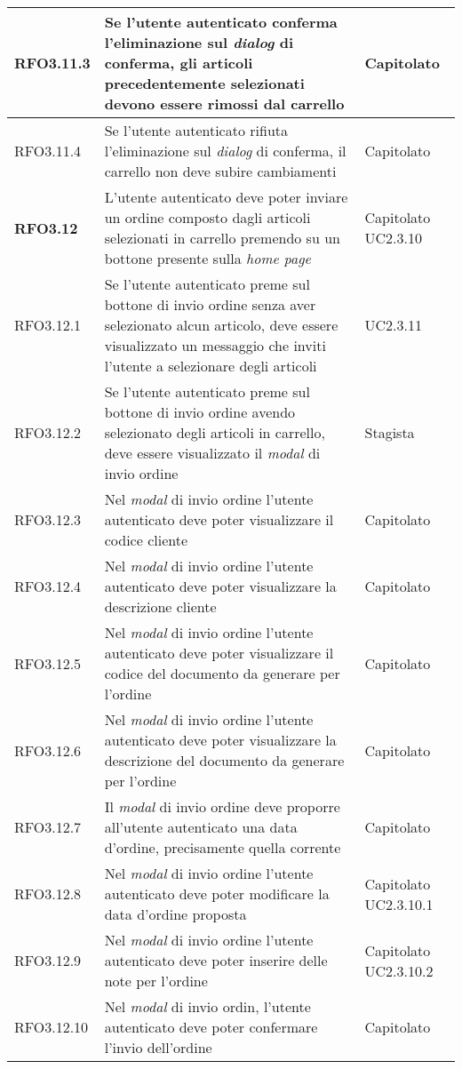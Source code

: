 {\begin{center}
\begin{longtable}{ | >{\centering\arraybackslash}p{2.5cm} | >{\arraybackslash}p{7cm} | >{\centering\arraybackslash}p{2cm} | }
RFO3.11.3 & Se l'utente autenticato conferma l'eliminazione sul \textit{dialog} di conferma, gli articoli precedentemente selezionati devono essere rimossi dal carrello & Capitolato \\ \hline
RFO3.11.4 & Se l'utente autenticato rifiuta l'eliminazione sul \textit{dialog} di conferma, il carrello non deve subire cambiamenti & Capitolato \\ \hline
\textbf{RFO3.12} & L'utente autenticato deve poter inviare un ordine composto dagli articoli selezionati in carrello premendo su un bottone presente sulla \textit{home page} & Capitolato UC2.3.10\\ \hline
RFO3.12.1 & Se l'utente autenticato preme sul bottone di invio ordine senza aver selezionato alcun articolo, deve essere visualizzato un messaggio che inviti l'utente a selezionare degli articoli & UC2.3.11 \\ \hline
RFO3.12.2 & Se l'utente autenticato preme sul bottone di invio ordine avendo selezionato degli articoli in carrello, deve essere visualizzato il \textit{modal} di invio ordine & Stagista \\ \hline
RFO3.12.3 & Nel \textit{modal} di invio ordine l'utente autenticato deve poter visualizzare il codice cliente & Capitolato \\ \hline
RFO3.12.4 & Nel \textit{modal} di invio ordine l'utente autenticato deve poter visualizzare la descrizione cliente & Capitolato \\ \hline
RFO3.12.5 & Nel \textit{modal} di invio ordine l'utente autenticato deve poter visualizzare il codice del documento da generare per l'ordine & Capitolato \\ \hline
RFO3.12.6 & Nel \textit{modal} di invio ordine l'utente autenticato deve poter visualizzare la descrizione del documento da generare per l'ordine & Capitolato \\ \hline
RFO3.12.7 & Il \textit{modal} di invio ordine deve proporre all'utente autenticato una data d'ordine, precisamente quella corrente & Capitolato \\ \hline
RFO3.12.8 & Nel \textit{modal} di invio ordine l'utente autenticato deve poter modificare la data d'ordine proposta & Capitolato UC2.3.10.1\\ \hline
RFO3.12.9 & Nel \textit{modal} di invio ordine l'utente autenticato deve poter inserire delle note per l'ordine & Capitolato UC2.3.10.2\\ \hline
RFO3.12.10 & Nel \textit{modal} di invio ordin, l'utente autenticato deve poter confermare l'invio dell'ordine & Capitolato \\ \hline

\end{longtable}
\end{center}}
